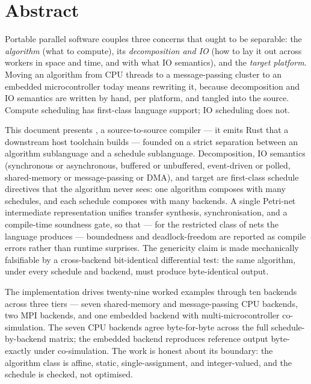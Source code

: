 \chapter*{Abstract}

Portable parallel software couples three concerns that ought to be separable:
the \emph{algorithm} (what to compute), its \emph{decomposition and IO} (how to
lay it out across workers in space and time, and with what IO semantics), and
the \emph{target platform}. Moving an algorithm from CPU threads to a
message-passing cluster to an embedded microcontroller today means rewriting it,
because decomposition and IO semantics are written by hand, per platform, and
tangled into the source. Compute scheduling has first-class language support;
IO scheduling does not.

This document presents \nuc, a source-to-source compiler --- it emits Rust
that a downstream host toolchain builds --- founded on a strict separation
between an algorithm sublanguage and a schedule sublanguage. Decomposition, IO
semantics (synchronous or asynchronous, buffered or unbuffered, event-driven or
polled, shared-memory or message-passing or DMA), and target are first-class
schedule directives that the algorithm never sees: one algorithm composes with
many schedules, and each schedule composes with many backends. A single
Petri-net intermediate representation unifies transfer synthesis,
synchronisation, and a compile-time soundness gate, so that --- for the restricted
class of nets the language produces --- boundedness and
deadlock-freedom are reported as compile errors rather than runtime surprises.
The genericity claim is made mechanically falsifiable by a cross-backend
bit-identical differential test: the same algorithm, under every schedule and
backend, must produce byte-identical output.

The implementation drives twenty-nine worked examples through ten backends
across three tiers --- seven shared-memory and message-passing CPU backends, two
MPI backends, and one embedded backend with multi-microcontroller co-simulation.
The seven CPU backends agree byte-for-byte across the full schedule-by-backend
matrix; the embedded backend reproduces reference output byte-exactly under
co-simulation. The work is honest about its boundary: the algorithm class is
affine, static, single-assignment, and integer-valued, and the schedule is
checked, not optimised.
